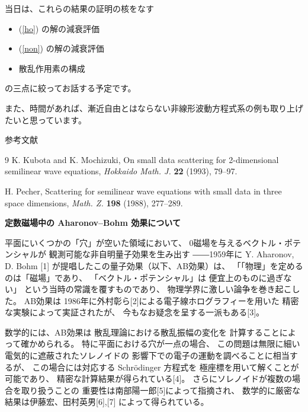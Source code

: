 \documentclass[uplatex,dvipdfmx]{jlreq}
\begin{document}
当日は、これらの結果の証明の核をなす

\begin{itemize}
\item
(\ref{ho}) の解の減衰評価

\item
(\ref{non}) の解の減衰評価

\item
散乱作用素の構成
\end{itemize}

の三点に絞ってお話する予定です。

また、時間があれば、漸近自由とはならない非線形波動方程式系の例も取り上げたいと思っています。

\begin{center}\textsc{参考文献}\end{center}
\begin{thebibliography}{9}
 K. Kubota and K. Mochizuki,
On small data scattering for 2-dimensional semilinear wave equations,
\textit{Hokkaido Math. J.}
\textbf{22} (1993), 79--97.

 H. Pecher,
Scattering for semilinear wave equations with small data
in three space dimensions,
\textit{Math. Z.}
\textbf{198} (1988), 277--289.
\end{thebibliography}

\newpage

\begin{center}
{\large\bfseries 定数磁場中の Aharonov--Bohm 効果について}\\[6pt]
\hspace*{\fill}{\large\bfseries 峯 拓矢\ (京都大・理)}
\end{center}

平面にいくつかの「穴」が空いた領域において、
0磁場を与えるベクトル・ポテンシャルが
観測可能な非自明量子効果を生み出す
――1959年に Y. Aharonov, D. Bohm
[1] が提唱したこの量子効果（以下、AB効果）は、
「「物理」を定めるのは「磁場」であり、
「ベクトル・ポテンシャル」は
便宜上のものに過ぎない」
という当時の常識を覆すものであり、
物理学界に激しい論争を巻き起こした。
AB効果は
1986年に外村彰ら[2]による電子線ホログラフィーを用いた
精密な実験によって実証されたが、
今もなお疑念を呈する一派もある[3]。

数学的には、AB効果は
散乱理論における散乱振幅の変化を
計算することによって確かめられる。
特に平面における穴が一点の場合、
この問題は無限に細い電気的に遮蔽されたソレノイドの
影響下での電子の運動を調べることに相当するが、
この場合には対応する Schr\"odinger 方程式を
極座標を用いて解くことが可能であり、
精密な計算結果が得られている[4]。
さらにソレノイドが複数の場合を取り扱うことの
重要性は南部陽一郎[5]によって指摘され、
数学的に厳密な結果は伊藤宏、田村英男[6],[7]
によって得られている。
\end{document}

